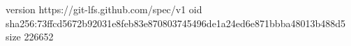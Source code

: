 version https://git-lfs.github.com/spec/v1
oid sha256:73ffcd5672b92031e8feb83e870803745496de1a24ed6e871bbba48013b488d5
size 226652
